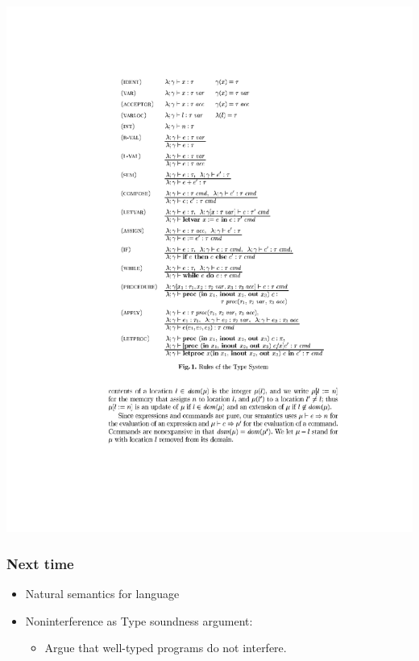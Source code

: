 \documentclass{beamer}
\begin{document}
\begin{frame}[fragile]
\begin{center}
\includegraphics[scale=1.2]{figures/typesys3}
\end{center}
\end{frame}

\begin{frame}
\frametitle{Next time}
\begin{itemize}
\item Natural semantics for language
\item Noninterference as Type soundness argument:
\begin{itemize}
\item Argue that well-typed programs do not interfere.
\end{itemize}
\end{itemize}
\end{frame}
\end{document}
